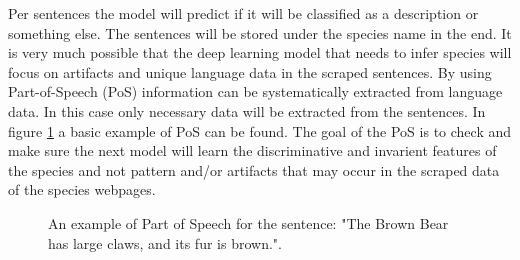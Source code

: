 \documentclass{article}
\begin{document}
Per sentences the model will predict if it will be classified as a description or something else.
The sentences will be stored under the species name in the end.
It is very much possible that the deep learning model that needs to infer species will focus on artifacts and unique language data in the scraped sentences.
By using Part-of-Speech (PoS) information can be systematically extracted from language data.
In this case only necessary data will be extracted from the sentences.
In figure \ref{fig:PoS_example} a basic example of PoS can be found.
The goal of the PoS is to check and make sure the next model will learn the discriminative and invarient features of the species and not pattern and/or artifacts that may occur in the scraped data of the species webpages. 

\begin{figure} [t]
    \centering
    \makebox[\textwidth][c]{}
    \caption{An example of Part of Speech for the sentence: "The Brown Bear has large claws, and its fur is brown.".}
    \label{fig:PoS_example}
\end{figure}

\end{document}
